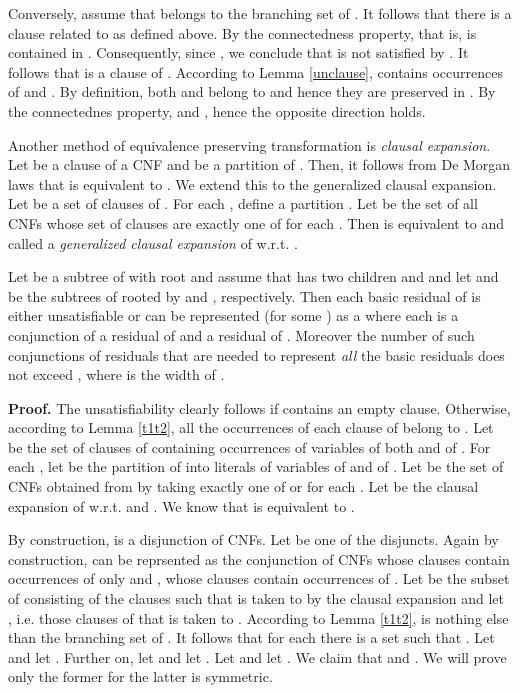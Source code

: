 \documentclass{llncs}
\begin{document}
Conversely, assume that  belongs to the branching set of .
It follows that there is a clause  related to  as defined above.
By the connectedness property,  that is,  is contained in .
Consequently, since , we conclude that  is not satisfied by .
It follows that  is a clause of .
According to Lemma \ref{unclause},  contains occurrences of  and
. By definition, both  and  belong to  and
hence they are preserved in . By the connectednes property,  and
, hence the opposite direction holds.    

Another method of equivalence preserving transformation is \emph{clausal expansion}. Let  be a clause
of a CNF  and  be a partition of . Then, it follows from De Morgan laws that
 is equivalent to .
We extend this to the generalized clausal expansion. Let  be a set of clauses of .
For each , define a partition . Let  be the set of all CNFs
 whose set of clauses are exactly one of  for each .
Then  is equivalent to  and called a
\emph{generalized clausal expansion} of  w.r.t. . 

\begin{lemma} \label{globaldisj}
Let  be a subtree of  with root  and assume that  has two children  and  and let 
and  be the subtrees of  rooted by  and , respectively. Then each basic residual 
of  is either  unsatisfiable or can be represented (for some ) 
as a  where 
each  is a conjunction of a residual of  and a residual of .
Moreover the number of such conjunctions of residuals that are needed to represent \emph{all} the basic residuals
 does not exceed , where  is the width of . 
\end{lemma}

{\bf Proof.}
The unsatisfiability clearly follows if  contains an empty clause.
Otherwise, according to Lemma \ref{t1t2}, all the occurrences of each clause of
 belong to . 
Let  be the set of clauses of  containing occurrences
of variables of both  and of .
For each , let  be the partition of  into literals of variables
of  and of .
Let  be the set of CNFs obtained from  by taking exactly one of  or 
for each . Let  be the clausal expansion of  w.r.t.  and .
We know that  is equivalent to . 

By construction,  is a disjunction of CNFs.
Let  be one of the disjuncts. Again by construction,  can be reprsented as the conjunction
of CNFs  whose clauses contain occurrences of  only and ,
whose clauses contain occurrences of . Let  be the subset of 
 consisting of the clauses  such that  is taken to  by the clausal
expansion and let , i.e. those clauses  of  that  is taken
to . According  to Lemma \ref{t1t2},  is nothing else than the branching set of .
It follows that for each  there is a set 
such that . Let  and let 
. Further on, let  and let .
Let  and let .
We claim that  and . We will prove only the former for the latter is symmetric.
\end{document}
